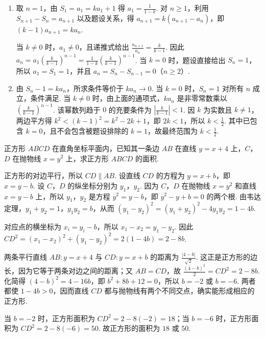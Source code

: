 \documentclass[UTF8,a4paper,oneside,11pt]{ctexbook}
\begin{document}
\begin{solution}
\begin{enumerate}
\item 取 \(n=1\)，由 \(S_1=a_1=ka_1+1\) 得 \(a_1=\frac1{1-k}\). 对 \(n\geq1\)，利用 \(S_{n+1}-S_n=a_{n+1}\) 以及题设关系，得 \(a_{n+1}=k(a_{n+1}-a_n)\)，即 \((k-1)a_{n+1}=ka_n\).

当 \(k\ne0\) 时，\(a_1\ne0\)，且递推式给出 \(\frac{a_{n+1}}{a_n}=\frac{k}{k-1}\). 因此 \(a_n=a_1\left(\frac{k}{k-1}\right)^{n-1}=\frac1{1-k}\left(\frac{k}{k-1}\right)^{n-1}\). 当 \(k=0\) 时，题设直接给出 \(S_n=1\)，所以 \(a_1=S_1=1\)，并且 \(a_n=S_n-S_{n-1}=0\)（\(n\geq2\)）.

\item 由 \(S_n-1=ka_n\)，所求条件等价于 \(ka_n\to0\). 当 \(k=0\) 时，\(S_n=1\) 对所有 \(n\) 成立，条件满足. 当 \(k\ne0\) 时，由上面的通项式，\(ka_n\) 是非零常数乘以 \(\left(\frac{k}{k-1}\right)^{n-1}\). 该幂数列趋于 \(0\) 的充要条件为 \(\left|\frac{k}{k-1}\right|<1\). 因 \(k\) 为实数且 \(k\ne1\)，两边平方得 \(k^2<(k-1)^2=k^2-2k+1\)，即 \(2k<1\)，所以 \(k<\frac12\). 其中已包含 \(k=0\)，且不会包含被题设排除的 \(k=1\)，故最终范围为 \(k<\frac12\).
\end{enumerate}
\end{solution}

\begin{problem}
正方形 \(ABCD\) 在直角坐标平面内，已知其一条边 \(AB\) 在直线 \(y = x + 4\) 上，\(C\)，\(D\) 在抛物线 \(x = y^2\) 上，求正方形 \(ABCD\) 的面积.
\end{problem}

\begin{solution}
正方形的对边平行，所以 \(CD\parallel AB\). 设直线 \(CD\) 的方程为 \(y=x+b\)，即 \(x=y-b\). 设 \(C\)，\(D\) 的纵坐标分别为 \(y_1\)，\(y_2\). 因为 \(C\)，\(D\) 在抛物线 \(x=y^2\) 和直线 \(x=y-b\) 上，所以 \(y_1\)，\(y_2\) 是方程 \(y^2=y-b\)，即 \(y^2-y+b=0\) 的两个根. 由韦达定理，\(y_1+y_2=1\)，\(y_1y_2=b\)，从而 \((y_1-y_2)^2=(y_1+y_2)^2-4y_1y_2=1-4b\).

对应点的横坐标为 \(x_i=y_i-b\)，所以 \(x_1-x_2=y_1-y_2\). 因此 \(CD^2=(x_1-x_2)^2+(y_1-y_2)^2=2(1-4b)=2-8b\).

两条平行直线 \(AB:y=x+4\) 与 \(CD:y=x+b\) 的距离为 \(\frac{|4-b|}{\sqrt2}\). 这正是正方形的边长，因为它等于两条对边之间的距离；又 \(AB=CD\)，故 \(\frac{(4-b)^2}{2}=CD^2=2-8b\). 化简得 \((4-b)^2=4-16b\)，即 \(b^2+8b+12=0\)，所以 \(b=-2\) 或 \(b=-6\). 两者都使 \(1-4b>0\)，因而直线 \(CD\) 都与抛物线有两个不同交点，确实能形成相应的正方形.

当 \(b=-2\) 时，正方形面积为 \(CD^2=2-8(-2)=18\)；当 \(b=-6\) 时，正方形面积为 \(CD^2=2-8(-6)=50\). 故正方形的面积为 \(18\) 或 \(50\).
\end{solution}

\end{document}
